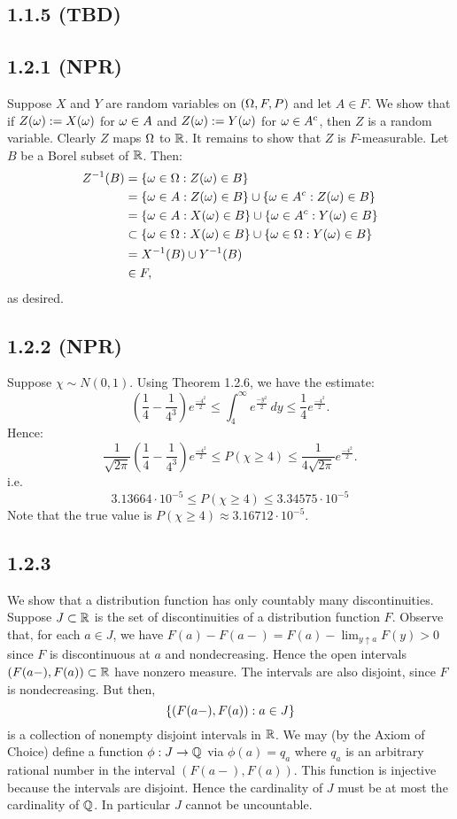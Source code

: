 \documentclass[11pt]{article}
\begin{document}
\subsection*{1.1.5 (TBD)}

\subsection*{1.2.1 (NPR)}

Suppose $X$ and $Y$ are random variables on $(\Omega,F, P)$ and let $A \in F$. We show that if $Z(\omega) := X(\omega)$ for $\omega \in A$ and $Z(\omega) := Y(\omega)$ for $\omega \in A^c$, then $Z$ is a random variable. Clearly $Z$ maps $\Omega$ to ${\mathbb R}$. It remains to show that $Z$ is $F$-measurable. Let $B$ be a Borel subset of ${\mathbb R}$. Then: \begin{align*}
    Z^{-1}(B) &= \{\omega \in \Omega : Z(\omega) \in B\} \\
    &= \{\omega \in A : Z(\omega) \in B\}\cup \{\omega \in A^c : Z(\omega) \in B\} \\
    &= \{\omega \in A : X(\omega) \in B\}\cup \{\omega \in A^c : Y(\omega) \in B\} \\
    &\subset \{\omega \in \Omega : X(\omega) \in B\}\cup \{\omega \in \Omega : Y(\omega) \in B\} \\
    &= X^{-1}(B) \cup Y^{-1}(B) \\
    & \in F,
\end{align*} as desired.

\subsection*{1.2.2 (NPR)}

Suppose $\chi \sim N(0,1)$. Using Theorem 1.2.6, we have the estimate: \[\left(\frac{1}{4} - \frac{1}{4^3}\right)e^{\frac{-4^2}{2}} \leq \int_4^\infty e^{\frac{-y^2}{2}} \,dy \leq \frac{1}{4}e^{\frac{-4^2}{2}}.\] Hence: \[\frac{1}{\sqrt{2\pi}}\left(\frac{1}{4} - \frac{1}{4^3}\right)e^{\frac{-4^2}{2}}\leq P(\chi \geq 4) \leq \frac{1}{4\sqrt{2\pi}}e^{\frac{-4^2}{2}}.\] i.e. \[3.13664 \cdot 10^{-5}\leq P(\chi \geq 4) \leq 3.34575 \cdot 10^{-5}\] Note that the true value is $P(\chi \geq 4) \approx 3.16712 \cdot 10^{-5}$.

\subsection*{1.2.3}

We show that a distribution function has only countably many discontinuities. Suppose $J \subset {\mathbb R}$ is the set of discontinuities of a distribution function $F$. Observe that, for each $a \in J$, we have $F(a) - F(a-) = F(a) - \lim_{y\uparrow a} F(y) > 0$ since $F$ is discontinuous at $a$ and nondecreasing. Hence the open intervals $(F(a-), F(a)) \subset {\mathbb R}$ have nonzero measure. The intervals are also disjoint, since $F$ is nondecreasing. But then, \[\{(F(a-), F(a)) : a \in J\}\] is a collection of nonempty disjoint intervals in ${\mathbb R}$. We may (by the Axiom of Choice) define a function $\phi: J \to {\mathbb Q}$ via $\phi(a) = q_a$ where $q_a$ is an arbitrary rational number in the interval $(F(a-), F(a))$. This function is injective because the intervals are disjoint. Hence the cardinality of $J$ must be at most the cardinality of ${\mathbb Q}$. In particular $J$ cannot be uncountable.
\end{document}
